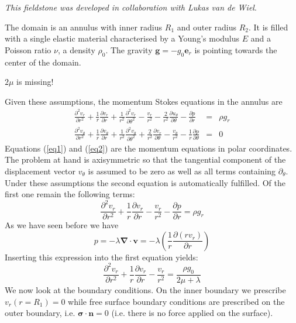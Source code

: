 
{\sl This fieldstone was developed in collaboration with Lukas van de Wiel}.

The domain is an annulus with inner radius $R_1$ and outer radius $R_2$. It is filled with a 
single elastic material characterised by a Young's modulus $E$ and a Poisson ratio $\nu$, a
density $\rho_0$. The gravity ${\bm g}=-g_0 {\bm e}_r$ is pointing towards the center of the domain.

{\color{red} $2\mu$ is missing!}

Given these assumptions, the momentum Stokes equations in the annulus are~\cite{scto01}
\begin{eqnarray}
   \frac{\partial^2 v_r}{\partial r^2} + \frac{1}{r} \frac{\partial v_r}{\partial r} +   
      \frac{1}{r^2} \frac{\partial^2 v_r}{\partial \theta^2}
    - \frac{v_r}{r^2} - \frac{2}{r^2} \frac{\partial u_\theta}{\partial \theta} 
-\frac{\partial p}{\partial r}  &=& \rho g_r \label{eq1} \\
\frac{\partial^2 v_\theta}{\partial r^2} + \frac{1}{r} \frac{\partial v_\theta}{\partial r} + \frac{1}{r^2} \frac{\partial^2 v_\theta}{\partial \theta^2}
+\frac{2}{r^2} \frac{\partial v_r}{\partial \theta} - \frac{v_\theta}{r^2} 
-\frac{1}{r}\frac{\partial p}{\partial \theta} &=& 0
\label{eq2} 
\end{eqnarray}
Equations (\ref{eq1}) and (\ref{eq2}) are the momentum equations in polar coordinates.
The problem at hand is axisymmetric so that the tangential component of the displacement
vector $v_\theta$ is assumed to be zero as well as all terms containing $\partial_\theta$.
Under these assumptions the second equation is automatically fulfilled.
Of the first one remain the following terms:
\[
\frac{\partial^2 v_r}{\partial r^2} + \frac{1}{r} \frac{\partial v_r}{\partial r} - \frac{v_r}{r^2} 
-\frac{\partial p}{\partial r}  = \rho g_r 
\]
As we have seen before we have 
\[
p=-\lambda {\bm \nabla}\cdot {\bm v}
= -\lambda \left( \frac{1}{r} \frac{\partial (r v_r)}{\partial r} \right)
\]
Inserting this expression into the first equation yields:
\[
\frac{\partial^2 v_r}{\partial r^2} + \frac{1}{r} \frac{\partial v_r}{\partial r} - \frac{v_r}{r^2} 
= \frac{\rho g_0 }{2\mu + \lambda}
\]
We now look at the boundary conditions. On the inner boundary we prescribe $v_r(r=R_1)=0$ while free
surface boundary conditions are prescribed on the outer boundary, i.e. ${\bm \sigma}\cdot{\bm n}=0$
(i.e. there is no force applied on the surface).

